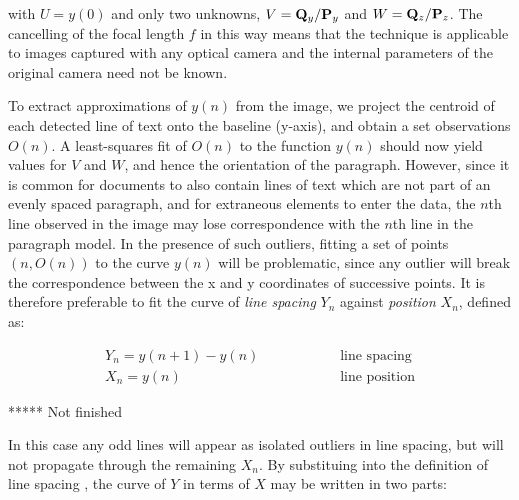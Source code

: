 { \parindent 0mm
with $U=y(0)$ and only two unknowns,
$V = {{ \bf Q }_y}/{{ \bf P }_y}$ and $W = {{ \bf Q }_z}/{{ \bf P }_z}$.
The cancelling of the focal length $f$ in this way means that the technique is applicable to images captured with any optical camera and the internal parameters of the original camera need not be known.

To extract approximations of $y(n)$ from the image, we project the centroid of each detected line of text onto the baseline (y-axis), and obtain a set observations $O(n)$.
A least-squares fit of $O(n)$ to the function $y(n)$ should now yield values for $V$ and $W$, and hence the orientation of the paragraph.
However, since it is common for documents to also contain lines of text which are not part of an evenly spaced paragraph, and for extraneous elements to enter the data, the $n$th line observed in the image may lose correspondence with the $n$th line in the paragraph model.
In the presence of such outliers, fitting a set of points $(n,O(n))$ to the curve $y(n)$ 
will be problematic, since any outlier will break the correspondence between the x and y coordinates of successive points.
It is therefore preferable to fit the curve of
{\em line spacing} $Y_n$ against {\em position} $X_n$, defined as:

\begin{eqnarray}
Y_n = y(n+1)-y(n) & \mbox{~~~~~~~~~~~~~~~line spacing} \label{linespacingsdefneqn} \\
X_n = y(n) & \mbox{~~~~~~~~~~~~~~~line position} \label{linepositiondefneqn}
\end{eqnarray}

***** Not finished

In this case any odd lines will appear as isolated outliers in line spacing, but will not propagate through the remaining $X_n$. %
By substituing  into the definition of line spacing , the curve of $Y$ in terms of $X$ may be written in two parts:
}

